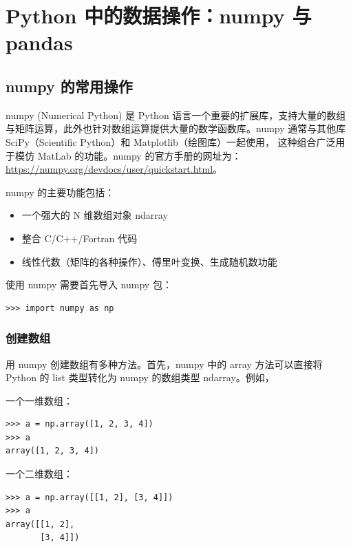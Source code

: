 \chapter{Python 中的数据操作：numpy 与 pandas}
\dominitoc
\section{numpy 的常用操作}

numpy (Numerical Python) 是 Python 语言一个重要的扩展库，支持大量的数组与矩阵运算，此外也针对数组运算提供大量的数学函数库。numpy 通常与其他库 SciPy（Scientific Python）和 Matplotlib（绘图库）一起使用， 这种组合广泛用于模仿 MatLab 的功能。numpy 的官方手册的网址为：\href{https://numpy.org/devdocs/user/quickstart.html}{https://numpy.org/devdocs/user/quickstart.html}。

numpy 的主要功能包括：

\begin{itemize}
  \item 一个强大的 N 维数组对象 ndarray

  \item 整合 C/C++/Fortran 代码

  \item 线性代数（矩阵的各种操作）、傅里叶变换、生成随机数功能

\end{itemize}

使用 numpy 需要首先导入 numpy 包：

\begin{lstlisting}[Language=Python]
>>> import numpy as np
\end{lstlisting}

\subsection{创建数组}

用 numpy 创建数组有多种方法。首先，numpy 中的 array 方法可以直接将 Python 的 list 类型转化为 numpy 的数组类型 ndarray。例如，

一个一维数组：

\begin{lstlisting}[Language=Python]
>>> a = np.array([1, 2, 3, 4])
>>> a
array([1, 2, 3, 4])
\end{lstlisting}

一个二维数组：
\begin{lstlisting}[Language=Python]
>>> a = np.array([[1, 2], [3, 4]])
>>> a
array([[1, 2],
       [3, 4]])
\end{lstlisting}

